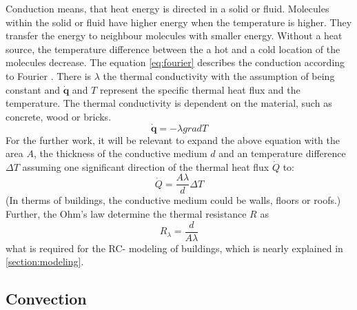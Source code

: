     Conduction means, that heat energy is directed in a solid or fluid. Molecules within the solid or fluid have higher energy when the temperature is higher. They transfer the energy to neighbour molecules with smaller energy. Without a heat source, the temperature difference between the a hot and a cold location of the molecules decrease.\cite{Kuchling.2007}
    \newline The equation \ref{eq:fourier} describes the conduction according to Fourier \cite{.2013}. There is $\lambda$ the thermal conductivity with the assumption of being constant and $\dot{\textbf{q}}$ and $T$ represent the specific thermal heat flux and the temperature. The thermal conductivity is dependent on the material, such as concrete, wood or bricks. 
    \begin{equation}
    \label{eq:fourier}
        \dot{\textbf{q}} = - \lambda grad T
    \end{equation}
    For the further work, it will be relevant to expand the above equation with the area $A$, the thickness of the conductive medium $d$ and an temperature difference $\Delta T$ assuming one significant direction of the thermal heat flux $\dot{Q}$ to:
    \begin{equation}
    \label{eq:conduction}
        \dot{Q} = \frac{A\lambda}{d} \Delta T
    \end{equation}
    (In therms of buildings, the conductive medium could be walls, floors or roofs.)
    \newline
    Further, the Ohm's law 
    \cite{Kuchling.2007} 
    determine the thermal resistance $R$ as
    \begin{equation}
    \label{eq:r_lambda}
        R_\lambda = \frac{d}{A\lambda}
    \end{equation}
    what is required for the RC- modeling of buildings, which is nearly explained in \ref{section:modeling}.

\subsection{Convection}
\label{subsection:convection}

